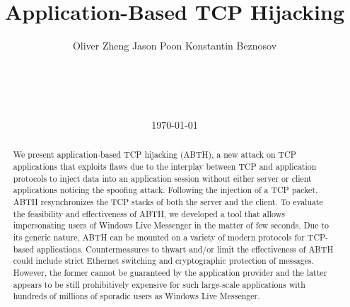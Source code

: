 \documentclass{sig-alternate}
\begin{document}

\title{
Application-Based TCP Hijacking
}

\author {
	\hspace{1.0cm} Oliver Zheng \hspace{3.4cm} Jason Poon \hspace{2.4cm}  Konstantin Beznosov\\
	\\
	\vspace{0.1cm}\\
	\\
	\\
}

\date{\today}

\maketitle

\begin{abstract}
We present application-based TCP hijacking (ABTH), a new attack on TCP applications that exploits flaws due to the interplay between TCP and application protocols to inject data into an application session without either server or client applications noticing the spoofing attack. 
Following the injection of a TCP packet, ABTH resynchronizes the TCP stacks of both the server and the client.
To evaluate the feasibility and effectiveness of ABTH, we developed a tool that allows impersonating users of Windows Live Messenger in the matter of few seconds. 
Due to its generic nature, ABTH can be mounted on a variety of modern protocols for TCP-based applications.
Countermeasures to thwart and/or limit the effectiveness of ABTH could include strict Ethernet switching and cryptographic protection of messages.
However, the former cannot be guaranteed by the application provider and the latter appears to be still prohibitively expensive for such large-scale applications with hundreds of millions of sporadic users as Windows Live Messenger.
\end{abstract}

\end{document}

